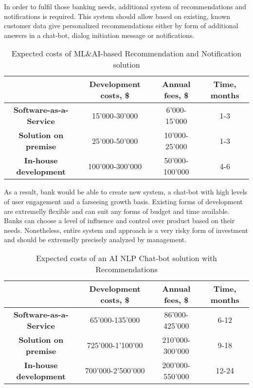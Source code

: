 In order to fulfil those banking needs, additional system of recommendations and notifications is required.
This system should allow based on existing, known customer data give personalized recommendations either by form of additional answers in a chat-bot, dialog initiation message or notifications.

\begin{table}
    \centering
    \caption{Expected costs of ML\&AI-based Recommendation and Notification solution}
    \begin{tabular}{| c | c | c | c |}
        \hline
        &
        \textbf{Development costs, \$} & 
        \textbf{Annual fees, \$} &
        \textbf{Time, months} \\ \hline 
       
        \textbf{Software-as-a-Service} & 
            15'000-30'000 & 
            6'000-15'000 &
            1-3 \\ \hline 
       
        \textbf{Solution on premise} & 
            25'000-50'000 &
            10'000-25'000 &
            1-3 \\ \hline 
            
        \textbf{In-house development} &
            100'000-300'000 &
            50'000-100'000 &
            4-6 \\ \hline
    \end{tabular}
    \medskip
\end{table}

As a result, bank would be able to create new system, a chat-bot with high levels of user engagement and a farseeing growth basis.
Existing forms of development are extremelly flexible and can suit any forms of budget and time available.
Banks can choose a level of influence and control over product based on their needs.
Nonetheless, entire system and approach is a very risky form of investment and should be extremelly precisely analyzed by management.

\begin{table}
    \centering
    \caption{Expected costs of an AI NLP Chat-bot solution with Recommendations}
    \begin{tabular}{| c | c | c | c |}
        \hline
        &
        \textbf{Development costs, \$} & 
        \textbf{Annual fees, \$} &
        \textbf{Time, months} \\ \hline 
       
        \textbf{Software-as-a-Service} & 
            65'000-135'000 & 
            86'000-425'000 &
            6-12 \\ \hline 
       
        \textbf{Solution on premise} & 
            725'000-1'100'00 &
            210'000-300'000 &
            9-18 \\ \hline 
            
        \textbf{In-house development} &
            700'000-2'500'000 &
            200'000-550'000 &
            12-24 \\ \hline
    \end{tabular}
    \medskip
\end{table}
